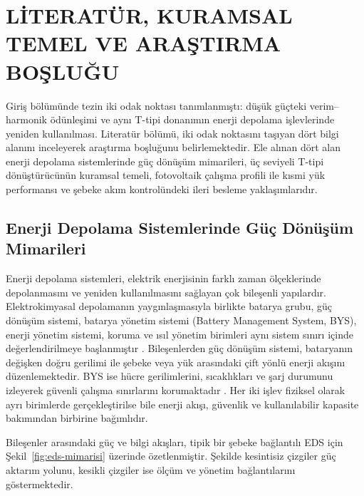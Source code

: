 \chapter{LİTERATÜR, KURAMSAL TEMEL VE ARAŞTIRMA BOŞLUĞU}
\label{chap:literatur}

Giriş bölümünde tezin iki odak noktası tanımlanmıştı: düşük güçteki verim--harmonik ödünleşimi ve aynı T-tipi donanımın enerji depolama işlevlerinde yeniden kullanılması. Literatür bölümü, iki odak noktasını taşıyan dört bilgi alanını inceleyerek araştırma boşluğunu belirlemektedir. Ele alınan dört alan enerji depolama sistemlerinde güç dönüşüm mimarileri, üç seviyeli T-tipi dönüştürücünün kuramsal temeli, fotovoltaik çalışma profili ile kısmi yük performansı ve şebeke akım kontrolündeki ileri besleme yaklaşımlarıdır.

\section{Enerji Depolama Sistemlerinde Güç Dönüşüm Mimarileri}

Enerji depolama sistemleri, elektrik enerjisinin farklı zaman ölçeklerinde depolanmasını ve yeniden kullanılmasını sağlayan çok bileşenli yapılardır. Elektrokimyasal depolamanın yaygınlaşmasıyla birlikte batarya grubu, güç dönüşüm sistemi, batarya yönetim sistemi (Battery Management System, BYS), enerji yönetim sistemi, koruma ve ısıl yönetim birimleri aynı sistem sınırı içinde değerlendirilmeye başlanmıştır \citep{Chen2009,Aneke2016,Hannan2017}. Bileşenlerden güç dönüşüm sistemi, bataryanın değişken doğru gerilimi ile şebeke veya yük arasındaki çift yönlü enerji akışını düzenlemektedir. BYS ise hücre gerilimlerini, sıcaklıkları ve şarj durumunu izleyerek güvenli çalışma sınırlarını korumaktadır \citep{Plett2015,Khan2024}. Her iki işlev fiziksel olarak ayrı birimlerde gerçekleştirilse bile enerji akışı, güvenlik ve kullanılabilir kapasite bakımından birbirine bağımlıdır.

Bileşenler arasındaki güç ve bilgi akışları, tipik bir şebeke bağlantılı EDS için Şekil~\ref{fig:eds-mimarisi} üzerinde özetlenmiştir. Şekilde kesintisiz çizgiler güç aktarım yolunu, kesikli çizgiler ise ölçüm ve yönetim bağlantılarını göstermektedir.

